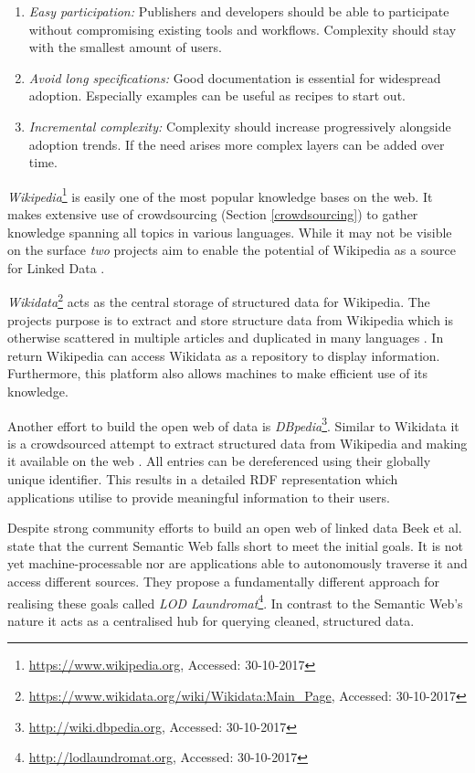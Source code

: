 \begin{enumerate}
\item \textit{Easy participation:} Publishers and developers should be able to participate without compromising existing tools and workflows. Complexity should stay with the smallest amount of users.
\item \textit{Avoid long specifications:} Good documentation is essential for widespread adoption. Especially examples can be useful as recipes to start out.
\item \textit{Incremental complexity:} Complexity should increase progressively alongside adoption trends. If the need arises more complex layers can be added over time.
\end{enumerate}

\textit{Wikipedia}\footnote{\url{https://www.wikipedia.org}, Accessed: 30-10-2017} is easily one of the most popular knowledge bases on the web.
It makes extensive use of crowdsourcing (Section \ref{crowdsourcing}) to gather knowledge spanning all topics in various languages.
While it may not be visible on the surface \textit{two} projects aim to enable the potential of Wikipedia as a source for Linked Data \cite{Vrandecic2014b}.

\textit{Wikidata}\footnote{\url{https://www.wikidata.org/wiki/Wikidata:Main_Page}, Accessed: 30-10-2017} acts as the central storage of structured data for Wikipedia.
The projects purpose is to extract and store structure data from Wikipedia which is otherwise scattered in multiple articles and duplicated in many languages \cite{Vrandecic2014b}. 
In return Wikipedia can access Wikidata as a repository to display information.
Furthermore, this platform also allows machines to make efficient use of its knowledge.

Another effort to build the open web of data is \textit{DBpedia}\footnote{\url{http://wiki.dbpedia.org}, Accessed: 30-10-2017}.
Similar to Wikidata it is a crowdsourced attempt to extract structured data from Wikipedia and making it available on the web \cite{Bizer2009b}.
All entries can be dereferenced using their globally unique identifier. 
This results in a detailed RDF representation which applications utilise to provide meaningful information to their users.

Despite strong community efforts to build an open web of linked data Beek et al. \cite{If2016b} state that the current Semantic Web falls short to meet the initial goals.
It is not yet machine-processable nor are applications able to autonomously traverse it and access different sources.
They propose a fundamentally different approach for realising these goals called \textit{LOD Laundromat}\footnote{\url{http://lodlaundromat.org}, Accessed: 30-10-2017}.
In contrast to the Semantic Web's nature it acts as a centralised hub for querying cleaned, structured data.

